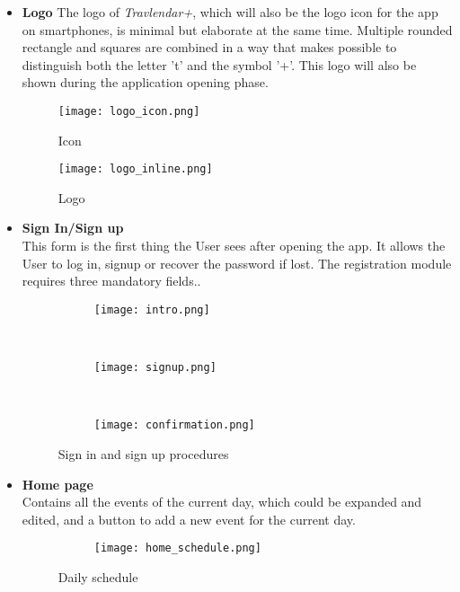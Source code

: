 \begin{itemize}
	\item \textbf{Logo}
	The logo of \textit{Travlendar+}, which will also be the logo icon for the app on smartphones, is minimal but elaborate at the same time.
	Multiple rounded rectangle and squares are combined in a way that makes possible to distinguish both the letter 't' and the symbol '+'. This logo will also be shown during the application opening phase. \\
	
	\begin{figure}[H]
		\centering
		\texttt{[image: logo\_icon.png]}
		\caption{Icon}
	\end{figure}

	\begin{figure}[H]
		\centering
		\texttt{[image: logo\_inline.png]}
		\caption{Logo}
	\end{figure}
	
	\newpage
	\item \textbf{Sign In/Sign up}\\
	This form is the first thing the User sees after opening the app. It allows the User to log in, signup or recover the password if lost. The registration module requires three mandatory fields..

	\begin{figure}[H]
		\centering
		\begin{subfigure}{0.25\textwidth}
			\centering
			\texttt{[image: intro.png]}
		\end{subfigure}
		~
		\begin{subfigure}{0.25\textwidth}
			\centering
			\texttt{[image: signup.png]}
		\end{subfigure}
			~
	\begin{subfigure}{0.25\textwidth}
		\centering
		\texttt{[image: confirmation.png]}
	\end{subfigure}
	\caption{Sign in and sign up procedures}
	\end{figure}

	\item \textbf{Home page}\\
	Contains all the events of the current day, which could be expanded and edited, and a button to add a new event for the current day.
	\begin{figure}[H]
		\centering
		\begin{subfigure}{0.25\textwidth}
			\centering
			\texttt{[image: home\_schedule.png]}
		\end{subfigure}
	\caption{Daily schedule}
	\end{figure}


\end{itemize}

